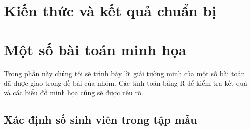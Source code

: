 \documentclass[a4paper]{article}
\theoremstyle{definition}
\begin{document}
\section{Kiến thức và kết quả chuẩn bị}\label{chuan_bi}
\section{Một số bài toán minh họa}\label{bai_tap}
Trong phần này chúng tôi sẽ trình bày lời giải tường minh của một số bài toán đã được giao trong đề bài của nhóm. Các tính toán bằng R để kiểm tra kết quả và các biểu đồ minh họa cũng sẽ được nêu rõ.

\subsection{Xác định số sinh viên trong tập mẫu}
\end{document}
